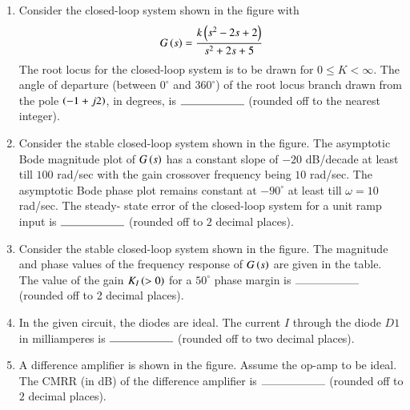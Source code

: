 \documentclass[journal,12pt,onecolumn]{IEEEtran}
\theoremstyle{remark}
\begin{document}
\begin{enumerate}[start=53]
	\item Consider the closed-loop system shown in the figure with
		$$G\left(s\right)=\frac{k\left(s^2-2s+2\right)}{s^2+2s+5}$$
		The root locus for the closed-loop system is to be drawn for $0\leq K<\infty$. The angle of departure (between $0^\circ$ and $360^\circ$) of the root locus branch drawn from the pole $\left(-1+j2\right)$, in degrees, is $\rule{2cm}{0.4pt}$ (rounded off to the nearest integer).
\begin{figure}[H]
    \centering
\end{figure}
		

	\item Consider the stable closed-loop system shown in the figure. The asymptotic Bode magnitude plot of $G\left(s\right)$ has a constant slope of $-20$ dB/decade at least till $100$ rad/sec with the gain crossover frequency being $10$ rad/sec. The asymptotic Bode phase plot remains constant at $-90^\circ$ at least till $\omega= 10$ rad/sec. The steady- state error of the closed-loop system for a unit ramp input is $\rule{2cm}{0.4pt}$ (rounded off to $2$ decimal places).
\begin{figure}[H]
    \centering
\end{figure}
		

	\item Consider the stable closed-loop system shown in the figure. The magnitude and phase values of the frequency response of $G\left(s\right)$ are given in the table. The value of the gain $K_I \left(> 0\right)$ for a $50^\circ$ phase margin is $\rule{2cm}{0.4pt}$ (rounded off to 2 decimal places).
\begin{table}[H]    
  \centering
  
\end{table}
\begin{figure}[H]
    \centering
\end{figure}

	\item In the given circuit, the diodes are ideal. The current $I$ through the diode $D1$ in milliamperes is $\rule{2cm}{0.4pt}$ (rounded off to two decimal places).
\begin{figure}[H]
    \centering
\end{figure}

	\item A difference amplifier is shown in the figure. Assume the op-amp to be ideal. The CMRR (in dB) of the difference amplifier is $\rule{2cm}{0.4pt}$ (rounded off to $2$ decimal places).
\begin{figure}[H]
    \centering
\end{figure}


\end{enumerate}
\end{document}
